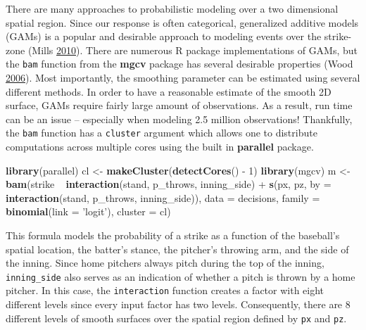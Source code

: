 \documentclass[12pt,]{isuthesis}
\newenvironment{Shaded}{\begin{snugshade}}{\end{snugshade}}
\newcommand{\KeywordTok}[1]{\textcolor[rgb]{0.13,0.29,0.53}{\textbf{{#1}}}}
\newcommand{\DataTypeTok}[1]{\textcolor[rgb]{0.13,0.29,0.53}{{#1}}}
\newcommand{\DecValTok}[1]{\textcolor[rgb]{0.00,0.00,0.81}{{#1}}}
\newcommand{\StringTok}[1]{\textcolor[rgb]{0.31,0.60,0.02}{{#1}}}
\newcommand{\NormalTok}[1]{{#1}}
\begin{document}
There are many approaches to probabilistic modeling over a two
dimensional spatial region. Since our response is often categorical,
generalized additive models (GAMs) is a popular and desirable approach
to modeling events over the strike-zone (Mills
\protect\hyperlink{ref-loess}{2010}). There are numerous R package
implementations of GAMs, but the \texttt{bam} function from the
\textbf{mgcv} package has several desirable properties (Wood
\protect\hyperlink{ref-mgcv}{2006}). Most importantly, the smoothing
parameter can be estimated using several different methods. In order to
have a reasonable estimate of the smooth 2D surface, GAMs require fairly
large amount of observations. As a result, run time can be an issue --
especially when modeling 2.5 million observations! Thankfully, the
\texttt{bam} function has a \texttt{cluster} argument which allows one
to distribute computations across multiple cores using the built in
\textbf{parallel} package.

\begin{Shaded}
\begin{Highlighting}[]
\KeywordTok{library}\NormalTok{(parallel) }
\NormalTok{cl <-}\StringTok{ }\KeywordTok{makeCluster}\NormalTok{(}\KeywordTok{detectCores}\NormalTok{() -}\StringTok{ }\DecValTok{1}\NormalTok{)}
\KeywordTok{library}\NormalTok{(mgcv) }
\NormalTok{m <-}\StringTok{ }\KeywordTok{bam}\NormalTok{(strike ~}\StringTok{ }\KeywordTok{interaction}\NormalTok{(stand, p_throws, inning_side) +}\StringTok{                }
\StringTok{  }\KeywordTok{s}\NormalTok{(px, pz, }\DataTypeTok{by =} \KeywordTok{interaction}\NormalTok{(stand, p_throws, inning_side)),              }
  \DataTypeTok{data =} \NormalTok{decisions, }\DataTypeTok{family =} \KeywordTok{binomial}\NormalTok{(}\DataTypeTok{link =} \StringTok{'logit'}\NormalTok{), }\DataTypeTok{cluster =} \NormalTok{cl)}
\end{Highlighting}
\end{Shaded}

This formula models the probability of a strike as a function of the
baseball's spatial location, the batter's stance, the pitcher's throwing
arm, and the side of the inning. Since home pitchers always pitch during
the top of the inning, \texttt{inning\_side} also serves as an
indication of whether a pitch is thrown by a home pitcher. In this case,
the \texttt{interaction} function creates a factor with eight different
levels since every input factor has two levels. Consequently, there are
8 different levels of smooth surfaces over the spatial region defined by
\texttt{px} and \texttt{pz}.
\end{document}
